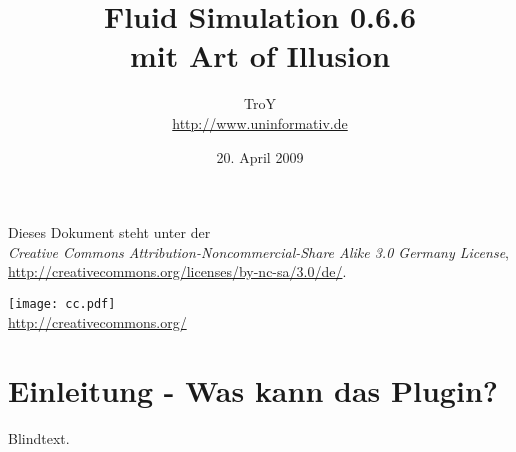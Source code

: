 \documentclass[12pt,a4paper]{scrartcl}
\begin{document}
\author{TroY \\ \url{http://www.uninformativ.de}}
\title{Fluid Simulation 0.6.6 \\ mit Art of Illusion}
\date{20. April 2009}
\maketitle
\thispagestyle{empty}

\vspace{100mm}

\begin{center}
	Dieses Dokument steht unter der \\
	\textit{Creative Commons Attribution-Noncommercial-Share Alike 3.0 Germany License}, \\
	\url{http://creativecommons.org/licenses/by-nc-sa/3.0/de/}.

	\texttt{[image: cc.pdf]} \\
	\url{http://creativecommons.org/}
\end{center}

\pagebreak


\tableofcontents
\thispagestyle{empty}
\pagebreak



\section{Einleitung - Was kann das Plugin?}
Blindtext.
\end{document}
